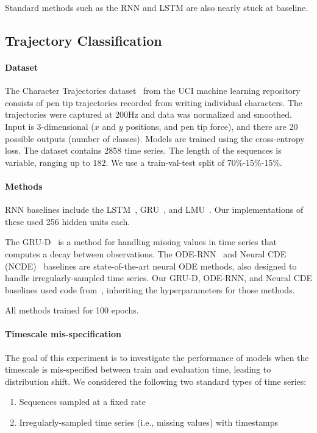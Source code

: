 \documentclass[../hippo.tex]{subfiles}
\begin{document}
Standard methods such as the RNN and LSTM are also nearly stuck at baseline.


\subsection{Trajectory Classification}
\label{sec:trajectory-details}

\paragraph{Dataset}
The Character Trajectories dataset~\citep{bagnall2018uea} from the UCI machine learning repository~\citep{Dua:2019} consists of pen tip trajectories recorded from writing individual characters.
The trajectories were captured at 200Hz and data was normalized and smoothed.
Input is 3-dimensional ($x$ and $y$ positions, and pen tip force),
and there are 20 possible outputs (number of classes).
Models are trained using the cross-entropy loss.
The dataset contains 2858 time series.
The length of the sequences is variable, ranging up to $182$.
We use a train-val-test split of 70\%-15\%-15\%.

\paragraph{Methods}

RNN baselines include the LSTM~\citep{lstm}, GRU~\citep{chung2014empirical}, and LMU~\citep{voelker2019legendre}.
Our implementations of these used 256 hidden units each.

The GRU-D~\citep{che2018recurrent} is a method for handling missing values in time series that computes a decay between observations.
The ODE-RNN~\citep{rubanova2019latent} and Neural CDE (NCDE)~\citep{kidger2020neural} baselines are state-of-the-art neural ODE methods, also designed to handle irregularly-sampled time series.
Our GRU-D, ODE-RNN, and Neural CDE baselines used code from~\citet{kidger2020neural}, inheriting the hyperparameters for those methods.


All methods trained for 100 epochs.

\paragraph{Timescale mis-specification}

The goal of this experiment is to investigate the performance of models when the timescale is mis-specified between train and evaluation time, leading to distribution shift.
We considered the following two standard types of time series:
\begin{enumerate}%
    \item Sequences sampled at a fixed rate
    \item Irregularly-sampled time series (i.e., missing values) with timestamps
\end{enumerate}
\end{document}
